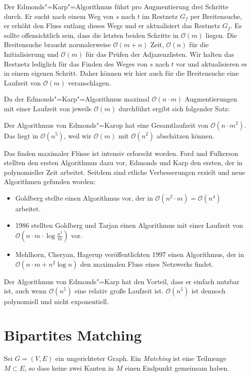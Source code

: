 Der Edmonds"=Karp"=Algorithmus führt pro Augmentierung drei Schritte durch. Er sucht nach einem Weg von $s$ nach $t$ im Restnetz $G_f$ per Breitensuche, er erhöht den Fluss entlang dieses Wegs und er aktualisiert das Restnetz $G_f$. Es sollte offensichtlich sein, dass die letzten beiden Schritte in $\mathcal{O}(m)$ liegen. Die Breitensuche braucht normalerweise $\mathcal{O}(m+n)$ Zeit, $\mathcal{O}(n)$ für die Initialisierung und $\mathcal{O}(m)$ für das Prüfen der Adjazenzlisten. Wir halten das Restnetz lediglich für das Finden des Weges von $s$ nach $t$ vor und aktualisieren es in einem eigenen Schritt. Daher können wir hier auch für die Breitensuche eine Laufzeit von $\mathcal{O}(m)$ veranschlagen.

Da der Edmonds"=Karp"=Algorithmus maximal $\mathcal{O}(n \cdot m)$ Augmentierungen mit einer Laufzeit von jeweils $\mathcal{O}(m)$ durchführt ergibt sich folgender Satz:

\begin{Satz}
  \hspace{\parindent}Der Algorithmus von Edmonds"=Karop hat eine Gesamtlaufzeit von $\mathcal{O}(n \cdot m^2)$. Das liegt in $\mathcal{O}(n^5)$, weil wir $\mathcal{O}(m)$ mit  $\mathcal{O}(n^2)$ abschätzen können.
\end{Satz}

Das finden maximaler Flüsse ist intensiv erforscht worden. Ford und Fulkerson stellten den ersten Algorithmus dazu vor, Edmonds und Karp den ersten, der in polynomieller Zeit arbeitet. Seitdem sind etliche Verbesserungen erzielt und neue Algorithmen gefunden worden:
\begin{itemize}
  \item Goldberg stellte einen Algorithmus vor, der in $\mathcal{O}(n^2 \cdot m) = \mathcal{O}(n^4)$ arbeitet.
  \item 1986 stellten Goldberg und Tarjan einen Algorithmus mit einer Laufzeit von $\mathcal{O}(n \cdot m \cdot \log{\frac{n^2}{m}})$ vor.
  \item Mehlhorn, Cheryan, Hagerup veröffentlichten 1997 einen Algorithmus, der in $\mathcal{O}(n \cdot m + n^2 \log n)$ den maximalen Fluss eines Netzwerks findet.
\end{itemize}

Der Algorithmus von Edmonds"=Karp hat den Vorteil, dass er einfach nutzbar ist, auch wenn $\mathcal{O}(n^5)$ eine relativ große Laufzeit ist. $\mathcal{O}(n^5)$ ist dennoch polynomiell und nicht exponentiell.

\section{Bipartites Matching}
\begin{Def}
  \hspace{\parindent}Sei $G=(V,E)$ ein ungerichteter Graph. Ein \textit{Matching} ist eine Teilmenge $M \subset E$, so dass keine zwei Kanten in $M$ einen Endpunkt gemeinsam haben.
\end{Def}

